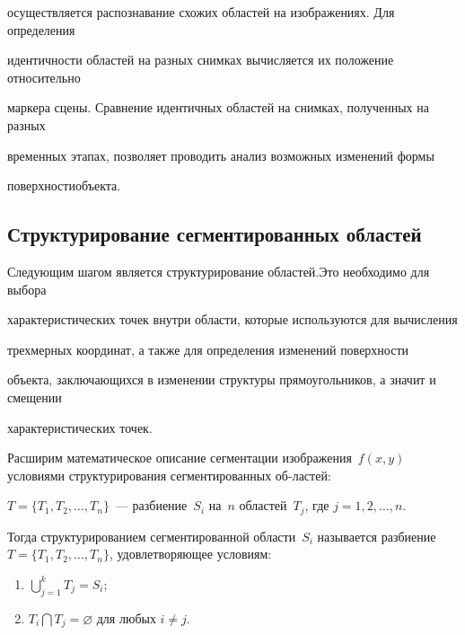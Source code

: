 осуществляется распознавание схожих областей на изображениях. Для определения 


иден\-тич\-ности областей на разных снимках вычисляется их положение относительно 


маркера сцены. Сравнение идентичных областей на снимках, полученных на разных 


временных этапах, позволяет проводить анализ возможных изменений формы 


по\-верх\-ности\linebreak объекта. 





\subsection{Структурирование сегментированных областей} %





Следующим шагом является структурирование областей.\linebreak Это необходимо для выбора 


характеристических точек внутри об\-ласти, которые используются для вычисления 


трехмерных координат, а также для определения изменений поверхности 


объекта, заключающихся в изменении структуры прямоугольников, а значит и смещении 


характеристических точек.





Расширим математическое описание сегментации изображения~$f(x,y)$ условиями структурирования сегментированных об-\linebreak ластей:


$T = \{T_1, T_2, \ldots , T_n\}$~--- разбиение~$S_i$ на~$n$ областей~$T_j$, где $j = 1, 2, \ldots , 


n$.





Тогда структурированием сегментированной области~$S_i$ называется разбиение $T = 


\{T_1, T_2, \ldots , T_n\}$, удовлетворяющее условиям:


\begin{enumerate}[(1)]


\item $\bigcup\limits_{j=1}^k T_j=S_i$;


\item $T_i\bigcap T_j=\varnothing$  для любых $i \not= j$.


\end{enumerate}





